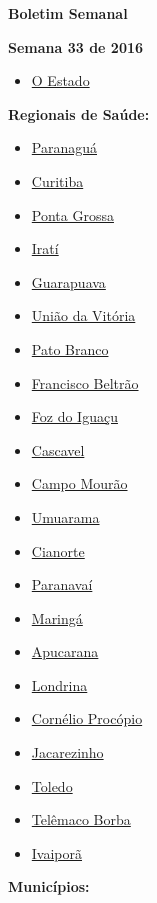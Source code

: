 \documentclass[10pt]{article} %
\begin{document}
\begin{minipage}[t]{.30\linewidth} %
\begin{mdframed}[style=sidebar,frametitle={}] %


\hypertarget{contents}{\textbf{{\large Boletim Semanal}}} 

\textbf{Semana 33 de 2016} %

\begin{itemize}
\item \hyperlink{estado}{O Estado} 
\end{itemize}


\textbf{Regionais de Saúde:}


\begin{itemize}\item \hyperlink{Prng}{Paranaguá}
\item \hyperlink{Crtb}{Curitiba}
\item \hyperlink{PntG}{Ponta Grossa}
\item \hyperlink{Irat}{Iratí}
\item \hyperlink{Grpv}{Guarapuava}
\item \hyperlink{UndV}{União da Vitória}
\item \hyperlink{PtBr}{Pato Branco}
\item \hyperlink{FrnB}{Francisco Beltrão}
\item \hyperlink{FzdI}{Foz do Iguaçu}
\item \hyperlink{Cscv}{Cascavel}
\item \hyperlink{CmpM}{Campo Mourão}
\item \hyperlink{Umrm}{Umuarama}
\item \hyperlink{Cnrt}{Cianorte}
\item \hyperlink{Prnv}{Paranavaí}
\item \hyperlink{Mrng}{Maringá}
\item \hyperlink{Apcr}{Apucarana}
\item \hyperlink{Lndr}{Londrina}
\item \hyperlink{CrnP}{Cornélio Procópio}
\item \hyperlink{Jcrz}{Jacarezinho}
\item \hyperlink{Told}{Toledo}
\item \hyperlink{TlmB}{Telêmaco Borba}
\item \hyperlink{Ivpr}{Ivaiporã}\end{itemize}
\textbf{Municípios:}


\end{mdframed}
\end{minipage}
\end{document}
